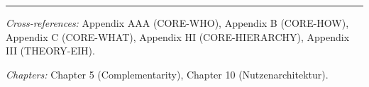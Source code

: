 \nocite{bcm_master}



\vspace{1em}
\hrule
\vspace{0.5em}

\noindent\textit{Cross-references:}
Appendix AAA (CORE-WHO),
Appendix B (CORE-HOW),
Appendix C (CORE-WHAT),
Appendix HI (CORE-HIERARCHY),
Appendix III (THEORY-EIH).

\noindent\textit{Chapters:} Chapter 5 (Complementarity), Chapter 10 (Nutzenarchitektur).



